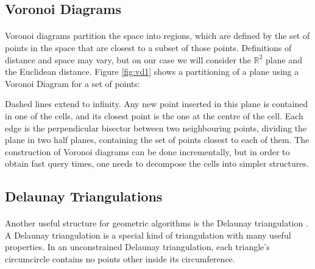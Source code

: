 \subsection{Voronoi Diagrams}
\paragraph{}
Voronoi diagrams \cite{tricard2} partition the space into regions, which are defined by the set of points in the space that are closest to a subset of those points. Definitions of distance and space may vary, but on our case we will consider the $\mathbb{R}^2$ plane and the Euclidean distance.
Figure \ref{fig:vd1} shows a partitioning of a plane using a Voronoi Diagram for a set of points:

\noindent
Dashed lines extend to infinity. Any new point inserted in this plane is contained in one of the cells, and its closest point is the one at the centre of the cell.
Each edge is the perpendicular bisector between two neighbouring points, dividing the plane in two half planes, containing the set of points closest to each of them.
The construction of Voronoi diagrams can be done incrementally, but in order to obtain fast query times, one needs to decompose the cells into simpler structures. 
\subsection{Delaunay Triangulations}
\paragraph{}
Another useful structure for geometric algorithms is the Delaunay triangulation \cite{tricard2}.
A Delaunay triangulation \cite{delbible} is a special kind of triangulation with many useful properties. 
In an unconstrained Delaunay triangulation, each triangle's circumcircle contains no points other inside its circumference.
